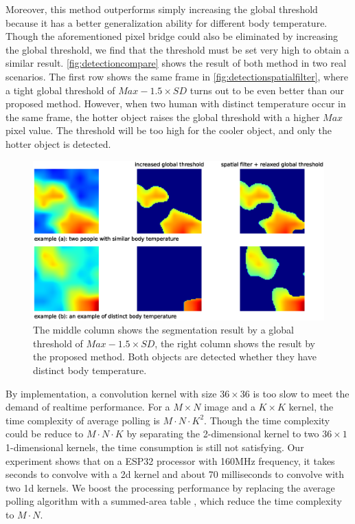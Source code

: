 Moreover, this method outperforms simply increasing the global threshold because it has a better generalization ability for different body temperature. Though the aforementioned pixel bridge could also be eliminated by increasing the global threshold, we find that the threshold must be set very high to obtain a similar result. \autoref{fig:detectioncompare} shows the result of both method in two real scenarios. The first row shows the same frame in \autoref{fig:detectionspatialfilter}, where a tight global threshold of $Max-1.5\times SD$ turns out to be even better than our proposed method. However, when two human with distinct temperature occur in the same frame, the hotter object raises the global threshold with a higher $Max$ pixel value. The threshold will be too high for the cooler object, and only the hotter object is detected.
\begin{figure}
  \centering
  \includegraphics[width=\textwidth]{figures/detect_compare.eps}
  \caption{The middle column shows the segmentation result by a global threshold of $Max-1.5\times SD$, the right column shows the result by the proposed method. Both objects are detected whether they have distinct body temperature.}\label{fig:detectioncompare}
\end{figure}

By implementation, a convolution kernel with size $36\times36$ is too slow to meet the demand of realtime performance. For a $M\times N$ image and a $K\times K$ kernel, the time complexity of average polling is $M\cdot N\cdot K^2$. Though the time complexity could be reduce to $M\cdot N\cdot K$ by separating the 2-dimensional kernel to two $36\times 1$ 1-dimensional kernels, the time consumption is still not satisfying. Our experiment shows that on a ESP32 processor with 160MHz frequency, it takes seconds to convolve with a 2d kernel and about 70 milliseconds to convolve with two 1d kernels. We boost the processing performance by replacing the average polling algorithm with a summed-area table \cite{summedareatables}, which reduce the time complexity to $M\cdot N$.

